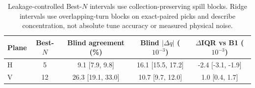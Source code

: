 \begin{table}[!htb]
  \centering
  \caption{Leakage-controlled Best-$N$ intervals use collection-preserving spill blocks. Ridge intervals use overlapping-turn blocks on exact-paired picks and describe concentration, not absolute tune accuracy or measured physical noise.}
  \label{tab:results}
  \small
  \begin{tabular}{@{}lcccc@{}}
    \toprule
    Plane & Best-$N$ & Blind agreement (\%) & Blind $|\Delta q|$ ($10^{-3}$) & $\Delta$IQR vs B1 ($10^{-3}$) \\
    \midrule
    H & 5 & 9.1 [7.9, 9.8] & 16.1 [15.5, 17.2] & -2.4 [-3.1, -1.9] \\
    V & 12 & 26.3 [19.1, 33.0] & 10.7 [9.7, 12.0] & 1.0 [0.4, 1.7] \\
    \bottomrule
  \end{tabular}
\end{table}
